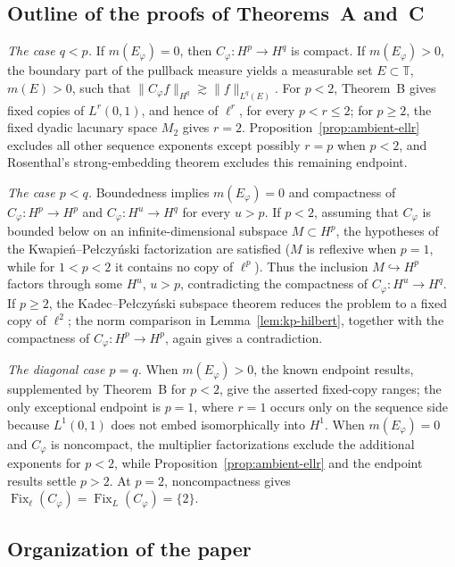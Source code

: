 \documentclass[11pt, reqno]{amsart}
\theoremstyle{definition}
\theoremstyle{remark}
\newcommand{\T}{\mathbb{T}}
\begin{document}
\subsection*{Outline of the proofs of Theorems~A and~C}

\noindent\textit{The case \(q<p\).}
If \(m(E_\varphi)=0\), then \(C_\varphi:H^p\to H^q\) is compact.
If \(m(E_\varphi)>0\), the boundary part of the pullback measure
yields a measurable set \(E\subset\T\), \(m(E)>0\), such that
\(\|C_\varphi f\|_{H^q}
\gtrsim
\|f\|_{L^q(E)}.
\)
For \(p<2\), Theorem~B gives fixed copies of \(L^r(0,1)\), and hence
of \(\ell^r\), for every \(p<r\le2\); for \(p\ge2\), the fixed
dyadic lacunary space \(M_2\) gives \(r=2\).
Proposition~\ref{prop:ambient-ellr} excludes all other sequence
exponents except possibly \(r=p\) when \(p<2\), and Rosenthal's
strong-embedding theorem excludes this remaining endpoint.

\smallskip
\noindent\textit{The case \(p<q\).}
Boundedness implies \(m(E_\varphi)=0\) and compactness of
\(C_\varphi:H^p\to H^p\) and \(C_\varphi:H^u\to H^q\) for every
\(u>p\). If \(p<2\), assuming that \(C_\varphi\) is bounded below on
an infinite-dimensional subspace \(M\subset H^p\), the hypotheses of
the Kwapie\'n--Pe\l czy\'nski factorization are satisfied
(\(M\) is reflexive when \(p=1\), while for \(1<p<2\) it contains no
copy of \(\ell^p\)). Thus the inclusion \(M\hookrightarrow H^p\)
factors through some \(H^u\), \(u>p\), contradicting the compactness
of \(C_\varphi:H^u\to H^q\).
If \(p\ge2\), the Kadec--Pe\l czy\'nski subspace theorem reduces the
problem to a fixed copy of \(\ell^2\); the norm comparison in
Lemma~\ref{lem:kp-hilbert}, together with the compactness of
\(C_\varphi:H^p\to H^p\), again gives a contradiction.

\smallskip
\noindent\textit{The diagonal case \(p=q\).}
When \(m(E_\varphi)>0\), the known endpoint results, supplemented
by Theorem~B for \(p<2\), give the asserted fixed-copy ranges; the
only exceptional endpoint is \(p=1\), where \(r=1\) occurs only on
the sequence side because \(L^1(0,1)\) does not embed isomorphically
into \(H^1\). When \(m(E_\varphi)=0\) and \(C_\varphi\) is noncompact,
the multiplier factorizations exclude the additional exponents for
\(p<2\), while Proposition~\ref{prop:ambient-ellr} and the endpoint
results settle \(p>2\). At \(p=2\), noncompactness gives
\(\operatorname{Fix}_{\ell}(C_\varphi)
=\operatorname{Fix}_{L}(C_\varphi)=\{2\}\).

\subsection*{Organization of the paper}
\end{document}
